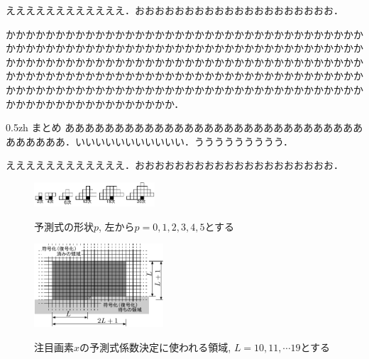 \documentclass[9pt,dvipdfmx,uplatex]{jsarticle}
\makeatletter
\def\section{\@startsection {section}{1}{\z@}
{0.6zh}%
{0.5zh}%
 {\normalsize\bfseries\gtfamily}%
 }
\makeatother
\begin{document}
ええええええええええええ．おおおおおおおおおおおおおおおおおおおお．

かかかかかかかかかかかかかかかかかかかかかかかかかかかかかかかかかかかかかかかかかかかかかかかかかかかかかかかかかかかかかかかかかかかかかかかかかかかかかかかかかかかかかかかかかかかかかかかかかかかかかかかかかかかかかかかかかかかかかかかかかかかかかかかかかかかかかかかかかかかかかかかかかかかかかかかかかかかかかかかかかかかかかかかかかかかかかかかかかかかかかかかかかかかかかかかかかかかかか．



\section{まとめ}
ああああああああああああああああああああああああああああああああああああ．いいいいいいいいいいい．ううううううううう．

ええええええええええええ．おおおおおおおおおおおおおおおおおおおお．


\begin{figure}[t]
   \begin{center}
    \vspace{5mm}
   \includegraphics[width=0.4\textwidth]{fig/fig1.pdf}
   \caption{予測式の形状$p$, 左から$p=0,1,2,3,4,5$とする}
   \label{FIG_YYY}
%
   \vspace{2mm}
\includegraphics[width=0.43\textwidth]{fig/fig2.pdf}
\caption{注目画素$x$の予測式係数決定に使われる領域, $L=10,11,\cdots19$とする}
\label{FIG_ZZZ}
   \end{center}
\end{figure}
\end{document}
